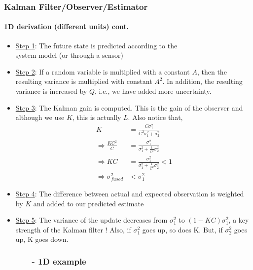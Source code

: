 \begin{frame}
\frametitle{Kalman Filter/Observer/Estimator}
\framesubtitle{1D derivation (different units) \tiny cont.}

\begin{itemize}\scriptsize
\item \underline{Step 1}: The future state is predicted according to the\\ system model (or through a sensor)
\item \underline{Step 2}: If a random variable is multiplied with a constant $A$, then the resulting variance is multiplied with constant $A^2$.  In addition, the resulting variance is increased by $Q$, i.e., we have added more uncertainty.
\item \underline{Step 3}: The Kalman gain is computed.  This is the gain of the observer and although we use $K$, this is actually $L$.  Also notice that,
\begin{equation*}
\begin{array}{rlllll}
K&=\frac{C\sigma_1^2}{C^2\sigma_1^2+\sigma_2^2}\\
\Rightarrow \frac{KC^2}{C}&=\frac{\sigma_1^2}{\sigma_1^2+\frac{1}{C^2}\sigma_2^2}\\
\Rightarrow KC&=\frac{\sigma_1^2}{\sigma_1^2+\frac{1}{C^2}\sigma_2^2} <1\\
\Rightarrow \sigma^2_{fused}&<\sigma^2_1
\end{array}
\end{equation*}
\item \underline{Step 4}: The difference between actual and expected observation is weighted by $K$ and added to our predicted estimate
\item \underline{Step 5}: The variance of the update decreases from $\sigma^2_1$ to $(1-KC)\sigma^2_1$, a key strength of the Kalman filter !  Also, if $\sigma^2_1$ goes up, so does K.  But, if $\sigma^2_2$ goes up, K goes down.  
\end{itemize}
\end{frame}



\subsubsection{\ \ \ \ \ \ - 1D example}

